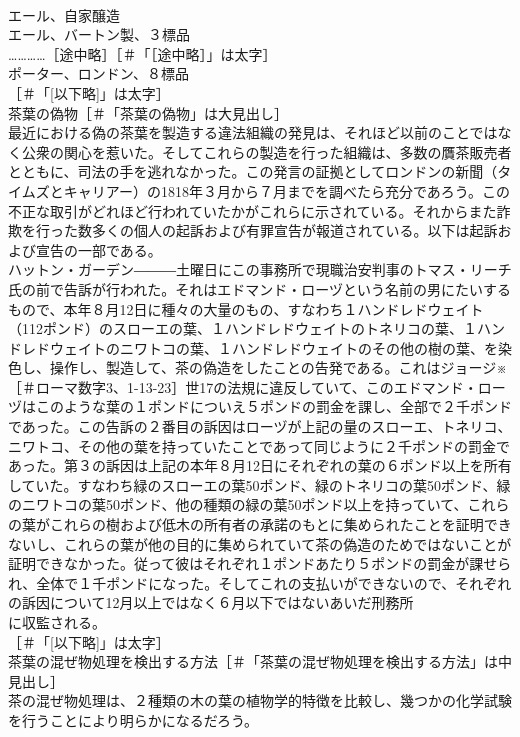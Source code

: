 \documentclass[8pt]{extreport}
\begin{document}
\begin{CJK}{UTF8}{min}
\\	エール、自家醸造　
\\	エール、バートン製、３標品 
\\	…………［途中略］［＃「［途中略］」は太字］
\\	ポーター、ロンドン、８標品 
\\	[以下略]［＃「[以下略]」は太字］
\\	茶葉の偽物［＃「茶葉の偽物」は大見出し］
\\	最近における偽の茶葉を製造する違法組織の発見は、それほど以前のことではなく公衆の関心を惹いた。そしてこれらの製造を行った組織は、多数の贋茶販売者とともに、司法の手を逃れなかった。この発言の証拠としてロンドンの新聞（タイムズとキャリアー）の1818年３月から７月までを調べたら充分であろう。この不正な取引がどれほど行われていたかがこれらに示されている。それからまた詐欺を行った数多くの個人の起訴および有罪宣告が報道されている。以下は起訴および宣告の一部である。
\\	ハットン・ガーデン―――土曜日にこの事務所で現職治安判事のトマス・リーチ氏の前で告訴が行われた。それはエドマンド・ローヅという名前の男にたいするもので、本年８月12日に種々の大量のもの、すなわち１ハンドレドウェイト（112ポンド）のスローエの葉、１ハンドレドウェイトのトネリコの葉、１ハンドレドウェイトのニワトコの葉、１ハンドレドウェイトのその他の樹の葉、を染色し、操作し、製造して、茶の偽造をしたことの告発である。これはジョージ※［＃ローマ数字3、1-13-23］世17の法規に違反していて、このエドマンド・ローヅはこのような葉の１ポンドについえ５ポンドの罰金を課し、全部で２千ポンドであった。この告訴の２番目の訴因はローヅが上記の量のスローエ、トネリコ、ニワトコ、その他の葉を持っていたことであって同じように２千ポンドの罰金であった。第３の訴因は上記の本年８月12日にそれぞれの葉の６ポンド以上を所有していた。すなわち緑のスローエの葉50ポンド、緑のトネリコの葉50ポンド、緑のニワトコの葉50ポンド、他の種類の緑の葉50ポンド以上を持っていて、これらの葉がこれらの樹および低木の所有者の承諾のもとに集められたことを証明できないし、これらの葉が他の目的に集められていて茶の偽造のためではないことが証明できなかった。従って彼はそれぞれ１ポンドあたり５ポンドの罰金が課せられ、全体で１千ポンドになった。そしてこれの支払いができないので、それぞれの訴因について12月以上ではなく６月以下ではないあいだ刑務所
\\	に収監される。
\\	[以下略]［＃「[以下略]」は太字］
\\	茶葉の混ぜ物処理を検出する方法［＃「茶葉の混ぜ物処理を検出する方法」は中見出し］
\\	茶の混ぜ物処理は、２種類の木の葉の植物学的特徴を比較し、幾つかの化学試験を行うことにより明らかになるだろう。

\end{CJK}
\end{document}
